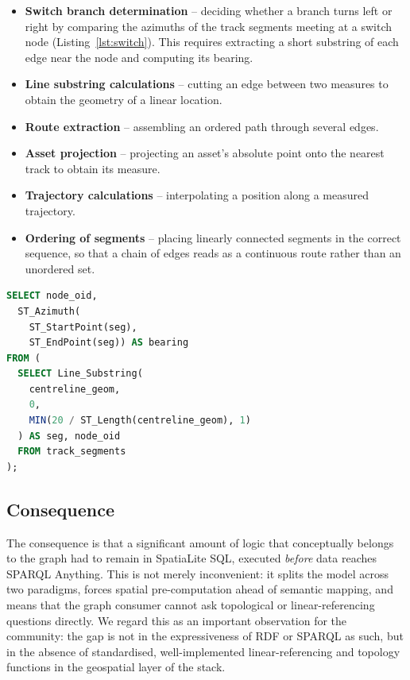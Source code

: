 \documentclass[twocolumn]{ceurart}
\begin{document}
\begin{itemize}
  \item \textbf{Switch branch determination} -- deciding whether a branch turns
        left or right by comparing the azimuths of the track segments meeting at
        a switch node (Listing~\ref{lst:switch}). This requires extracting a
        short substring of each edge near the node and computing its bearing.
  \item \textbf{Line substring calculations} -- cutting an edge between two
        measures to obtain the geometry of a linear location.
  \item \textbf{Route extraction} -- assembling an ordered path through several
        edges.
  \item \textbf{Asset projection} -- projecting an asset's absolute point onto
        the nearest track to obtain its measure.
  \item \textbf{Trajectory calculations} -- interpolating a position along a
        measured trajectory.
  \item \textbf{Ordering of segments} -- placing linearly connected segments in
        the correct sequence, so that a chain of edges reads as a continuous
        route rather than an unordered set.
\end{itemize}

\begin{lstlisting}[language=SQL,caption={Switch branch determination in
  SpatiaLite: the direction of a branch is derived from the azimuth of a short
  substring of each track segment near the switch node -- an operation with no
  GeoSPARQL equivalent.},label={lst:switch}]
SELECT node_oid,
  ST_Azimuth(
    ST_StartPoint(seg),
    ST_EndPoint(seg)) AS bearing
FROM (
  SELECT Line_Substring(
    centreline_geom,
    0,
    MIN(20 / ST_Length(centreline_geom), 1)
  ) AS seg, node_oid
  FROM track_segments
);
\end{lstlisting}

\subsection{Consequence}

The consequence is that a significant amount of logic that conceptually belongs
to the graph had to remain in SpatiaLite SQL, executed \emph{before} data reaches
SPARQL Anything. This is not merely inconvenient: it splits the model across two
paradigms, forces spatial pre-computation ahead of semantic mapping, and means
that the graph consumer cannot ask topological or linear-referencing questions
directly. We regard this as an important observation for the community: the gap
is not in the expressiveness of RDF or SPARQL as such, but in the absence of
standardised, well-implemented linear-referencing and topology functions in the
geospatial layer of the stack.
\end{document}
